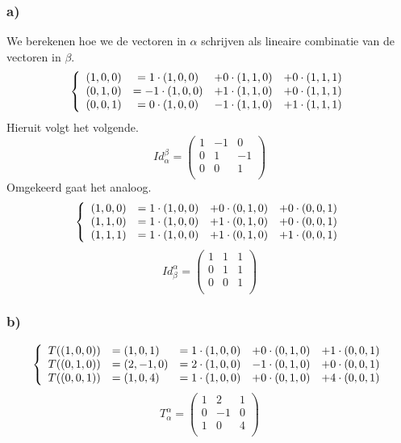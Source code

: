 \documentclass[lineaire_algebra_oplossingen.tex]{subfiles}
\begin{document}
\subsubsection*{a)}
We berekenen hoe we de vectoren in $\alpha$ schrijven als lineaire combinatie van de vectoren in $\beta$.
\[
\left\lbrace
\begin{array}{c c c c}
(1,0,0) &= 1\cdot (1,0,0) &+ 0\cdot (1,1,0) &+ 0\cdot (1,1,1)\\
(0,1,0) &= -1\cdot(1,0,0) &+ 1\cdot (1,1,0) &+ 0\cdot (1,1,1)\\
(0,0,1) &= 0\cdot(1,0,0) &-1\cdot (1,1,0) &+ 1\cdot (1,1,1)
\end{array}
\right.
\]
Hieruit volgt het volgende.
\[
Id_\alpha^\beta = 
\begin{pmatrix}
1 & -1 & 0\\
0 & 1 & -1\\
0 & 0 & 1\\
\end{pmatrix}
\]
Omgekeerd gaat het analoog.
\[
\left\lbrace
\begin{array}{c c c c}
(1,0,0) &= 1\cdot (1,0,0) &+ 0\cdot (0,1,0) &+ 0\cdot (0,0,1)\\
(1,1,0) &= 1\cdot (1,0,0) &+ 1\cdot (0,1,0) &+ 0\cdot (0,0,1)\\
(1,1,1) &= 1\cdot (1,0,0) &+ 1\cdot (0,1,0) &+ 1\cdot (0,0,1)
\end{array}
\right.
\]
\[
Id_\beta^\alpha = 
\begin{pmatrix}
1 & 1 & 1\\
0 & 1 & 1\\
0 & 0 & 1\\
\end{pmatrix}
\]
\subsubsection*{b)}
\[
\left\lbrace
\begin{array}{c l c c c}
T((1,0,0)) &= (1,0,1) &= 1\cdot (1,0,0) &+ 0\cdot (0,1,0) &+ 1\cdot (0,0,1) \\
T((0,1,0)) &= (2,-1,0)&= 2\cdot (1,0,0) &- 1\cdot (0,1,0) &+ 0\cdot (0,0,1)\\
T((0,0,1)) &= (1,0,4) &= 1\cdot (1,0,0) &+ 0\cdot (0,1,0) &+ 4\cdot (0,0,1)\\ 
\end{array}
\right.
\]
\[
T_\alpha^\alpha = 
\begin{pmatrix}
1 & 2 & 1\\
0 & -1 & 0\\
1 & 0 & 4\\
\end{pmatrix}
\]
\end{document}
